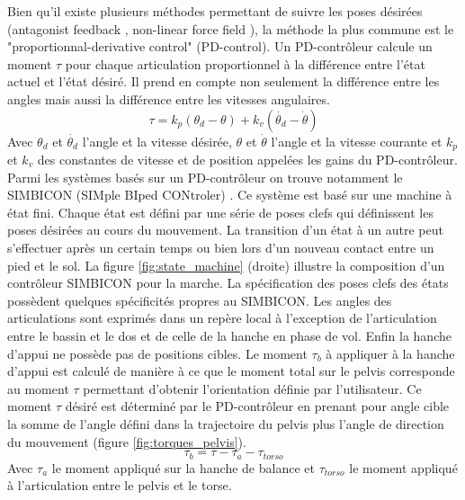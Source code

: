 \documentclass[runningheads,a4paper]{llncs}
\begin{document}
Bien qu'il existe plusieurs méthodes permettant de suivre les poses désirées (antagonist feedback \cite{neff2002modeling}, non-linear force field \cite{mussa1997nonlinear}), la méthode la plus commune est le "proportionnal-derivative control" (PD-control). Un PD-contrôleur calcule un moment  \(\tau\) pour chaque articulation proportionnel à la différence entre l'état actuel et l'état désiré. Il prend en compte non seulement la différence entre les angles mais aussi la différence entre les vitesses angulaires. 
\begin{equation}
\tau=k_p(\theta_d - \theta) + k_v(\dot{\theta_d} - \dot{\theta})
\label{eq:pd_controler}
\end{equation}
Avec \(\theta_d\) et \(\dot{\theta_d}\) l'angle et la vitesse désirée, \(\theta\) et \(\dot{\theta}\) l'angle et la vitesse courante et \(k_p\) et \(k_v\) des constantes de vitesse et de position appelées les gains du PD-contrôleur.
Parmi les systèmes basés sur un PD-contrôleur on trouve notamment le SIMBICON (SIMple BIped CONtroler) \cite{yin2007simbicon}. Ce système est basé sur une machine à état fini. Chaque état est défini par une série de poses clefs qui définissent les poses désirées au cours du mouvement. La transition d'un état à un autre peut s'effectuer après un certain temps ou bien lors d'un nouveau contact entre un pied et le sol. La figure \ref{fig:state_machine} (droite) illustre la composition d'un contrôleur SIMBICON pour la marche. La spécification des poses clefs des états possèdent quelques spécificités propres au SIMBICON. Les angles des articulations sont exprimés dans un repère local à l'exception de l'articulation entre le bassin et le dos et de celle de la hanche en phase de vol. Enfin la hanche d'appui ne possède pas de positions cibles. Le moment \(\tau_b \) à appliquer à la hanche d'appui est calculé de manière à ce que le moment total sur le pelvis corresponde au moment \(\tau \) permettant d'obtenir l'orientation définie par l'utilisateur. Ce moment \(\tau \) désiré est déterminé par le PD-contrôleur en prenant pour angle cible la somme de l'angle défini dans la trajectoire du pelvis plus l'angle de direction du mouvement (figure \ref{fig:torques_pelvis}).
\[
\tau_b=\tau - \tau_a - \tau_{torso}
\]
Avec \(\tau_a \) le moment appliqué sur la hanche de balance et \(\tau_{torso} \) le moment appliqué à l'articulation entre le pelvis et le torse.
\end{document}
